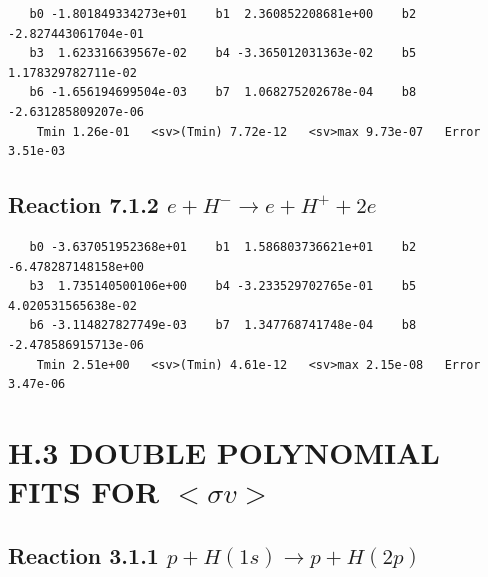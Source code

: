 \documentclass[12pt,dvipdfmx]{article}
\begin{document}
\begin{small}\begin{verbatim}
   b0 -1.801849334273e+01    b1  2.360852208681e+00    b2 -2.827443061704e-01
   b3  1.623316639567e-02    b4 -3.365012031363e-02    b5  1.178329782711e-02
   b6 -1.656194699504e-03    b7  1.068275202678e-04    b8 -2.631285809207e-06
    Tmin 1.26e-01   <sv>(Tmin) 7.72e-12   <sv>max 9.73e-07   Error 3.51e-03
\end{verbatim}\end{small}







\newpage
\subsection{
Reaction 7.1.2 $   e + H^- \rightarrow e + H^+ + 2e$}


\begin{small}\begin{verbatim}
   b0 -3.637051952368e+01    b1  1.586803736621e+01    b2 -6.478287148158e+00
   b3  1.735140500106e+00    b4 -3.233529702765e-01    b5  4.020531565638e-02
   b6 -3.114827827749e-03    b7  1.347768741748e-04    b8 -2.478586915713e-06
    Tmin 2.51e+00   <sv>(Tmin) 4.61e-12   <sv>max 2.15e-08   Error 3.47e-06
\end{verbatim}\end{small}







\newpage
\section{H.3   DOUBLE POLYNOMIAL FITS FOR $<\sigma v>$}

\subsection{
Reaction 3.1.1 $ p + H(1s) \rightarrow p + H(2p)$}
\end{document}

